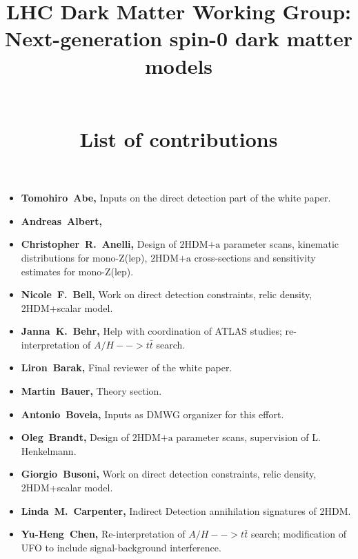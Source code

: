 \documentclass[a4paper, 11pt,notoc]{article}
\newcommand{\hdma}{\ensuremath{\textrm{2HDM+a}}\xspace}
\begin{document}
\title{\begin{boldmath} \huge LHC Dark Matter Working Group:  \\ Next-generation spin-0  dark matter models \vspace{7mm} \end{boldmath} \\ List of contributions}

\maketitle

\begin{itemize}

\item \textbf{Tomohiro~Abe,} Inputs on the direct detection part of the white paper. 

\item \textbf{Andreas~Albert,}

\item \textbf{Christopher~R.~Anelli,} Design of \hdma parameter scans,  kinematic distributions for mono-Z(lep), \hdma cross-sections and sensitivity estimates for mono-Z(lep).

\item \textbf{Nicole~F.~Bell,} Work on direct detection constraints, relic density, 2HDM+scalar model.

\item \textbf{Janna~K.~Behr,} Help with coordination of ATLAS studies; re-interpretation of $A/H-->t\bar{t}$ search.

\item \textbf{Liron~Barak,} Final reviewer of the white paper. 

\item \textbf{Martin~Bauer,} Theory section. 

\item \textbf{Antonio~Boveia,} Inputs as DMWG organizer for this effort. 

\item \textbf{Oleg~Brandt,} Design of \hdma parameter scans, supervision of L. Henkelmann. 

\item \textbf{Giorgio~Busoni,} Work on direct detection constraints, relic density, 2HDM+scalar model.

\item \textbf{Linda~M.~Carpenter,} Indirect Detection annihilation signatures of 2HDM.

\item \textbf{Yu-Heng~Chen,} Re-interpretation of $A/H-->t\bar{t}$ search; modification of UFO to include signal-background interference.


\end{itemize}
\end{document}
